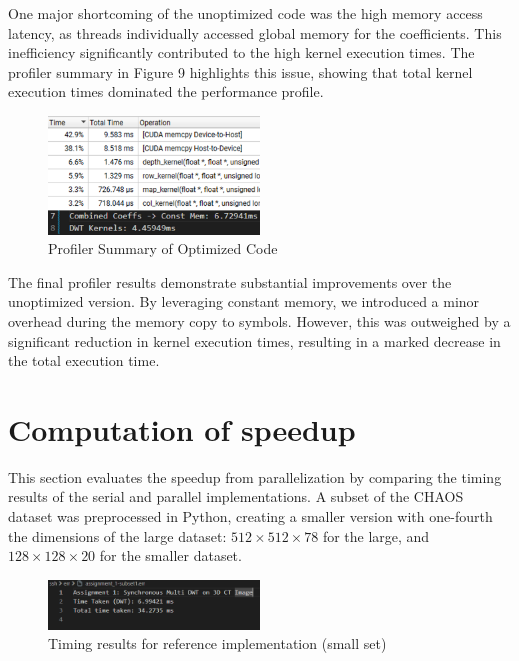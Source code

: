 \documentclass[journal,11pt]{IEEEtran}
\begin{document}
One major shortcoming of the unoptimized code was the high memory access latency, as threads individually accessed global memory for the coefficients. This inefficiency significantly contributed to the high kernel execution times. The profiler summary in Figure 9 highlights this issue, showing that total kernel execution times dominated the performance profile.

\begin{figure}[h] 
    \centering 
    \includegraphics[width=0.5\textwidth]{assets/optim-sum.png} 
    \caption{Profiler Summary of Optimized Code} 
    \label{fig:12} 
\end{figure}

The final profiler results demonstrate substantial improvements over the unoptimized version. By leveraging constant memory, we introduced a minor overhead during the memory copy to symbols. However, this was outweighed by a significant reduction in kernel execution times, resulting in a marked decrease in the total execution time.

\section{Computation of speedup}

This section evaluates the speedup from parallelization by comparing the timing results of the serial and parallel implementations. A subset of the CHAOS dataset was preprocessed in Python, creating a smaller version with one-fourth the dimensions of the large dataset: \(512 \times 512 \times 78\) for the large, and \(128 \times 128 \times 20\) for the smaller dataset.

\begin{figure}[h]
    \centering
    \includegraphics[width=0.5\textwidth]{assets/1-subset.png}
    \caption{Timing results for reference implementation (small set)}
    \label{fig:13}
\end{figure}
\end{document}
